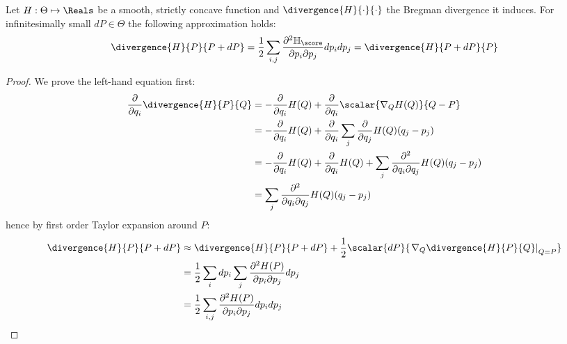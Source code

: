 \begin{statement} Let $H:\Theta\mapsto\Reals$ be a smooth, strictly concave function and $\divergence{H}{\cdot}{\cdot}$ the Bregman divergence it induces. For infinitesimally small $dP\in\Theta$ the following approximation holds:
\begin{equation}
	\divergence{H}{P}{P+ dP} = \frac{1}{2} \sum_{i,j} \frac{\partial^2 \mathbb{H}_{\score}}{\partial p_i\partial p_j} dp_{i} dp_{j} = 	\divergence{H}{P + dP}{P}
\end{equation}
\begin{proof}
	We prove the left-hand equation first:
	\begin{align}
		\frac{\partial}{\partial q_i} \divergence{H}{P}{Q} &=  -\frac{\partial}{\partial q_i} H(Q) + 	\frac{\partial}{\partial q_i}\scalar{\nabla_{Q} H(Q)}{Q-P}\\
			&=  - \frac{\partial}{\partial q_i} H(Q) + 	\frac{\partial}{\partial q_i}\sum_{j} \frac{\partial}{\partial q_j} H(Q) (q_j - p_j)\\
			&= - \frac{\partial}{\partial q_i} H(Q)  + \frac{\partial}{\partial q_i} H(Q) + \sum_{j} \frac{\partial^2}{\partial q_i \partial q_j} H(Q) (q_j - p_j)\\
			&= \sum_{j} \frac{\partial^2}{\partial q_i \partial q_j} H(Q) (q_j - p_j)
	\end{align}
	hence by first order Taylor expansion around $P$:
	\begin{align}
		\divergence{H}{P}{P+dP} &\approx  \divergence{H}{P}{P+dP}+ \frac{1}{2}\scalar{dP}{\left.\nabla_{Q}\divergence{H}{P}{Q}\right\rvert_{Q=P}}\\
			&= \frac{1}{2} \sum_{i} dp_i \sum_{j} \frac{\partial^2 H(P)}{\partial p_i\partial p_j} dp_j \\
			&= \frac{1}{2} \sum_{i,j} \frac{\partial^2 H(P)}{\partial p_i\partial p_j} dp_{i} dp_j
	\end{align}
	

\end{proof}
\end{statement}
